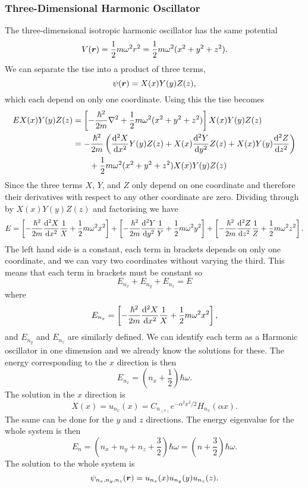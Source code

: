     \subsubsection{Three-Dimensional Harmonic Oscillator}
    The three-dimensional isotropic harmonic oscillator has the same potential
    \[V(\bm{r}) = \frac{1}{2}m\omega^2r^2 = \frac{1}{2}m\omega^2(x^2 + y^2 + z^2).\]
    We can separate the \gls{tise} into a product of three terms,
    \[\psi(\bm{r}) = X(x)Y(y)Z(z),\]
    which each depend on only one coordinate.
    Using this the \gls{tise} becomes
    \begin{align*}
        EX(x)Y(y)Z(z) &= \left[-\frac{\hbar^2}{2m}\nabla^2 + \frac{1}{2}m\omega^2(x^2 + y^2 + z^2)\right]X(x)Y(y)Z(z)\\
        &= -\frac{\hbar^2}{2m}\left(\dv[2]{X}{x}Y(y)Z(z) + X(x)\dv[2]{Y}{y}Z(z) + X(x)Y(y)\dv[2]{Z}{z}\right) \\
        &\qquad+ \frac{1}{2}m\omega^2(x^2 + y^2 + z^2)X(x)Y(y)Z(z)
    \end{align*}
    Since the three terms \(X\), \(Y\), and \(Z\) only depend on one coordinate and therefore their derivatives with respect to any other coordinate are zero.
    Dividing through by \(X(x)Y(y)Z(z)\) and factorising we have
    \[E = \left[-\frac{\hbar^2}{2m}\dv[2]{X}{x}\frac{1}{X} + \frac{1}{2}m\omega^2x^2\right] + \left[-\frac{\hbar^2}{2m}\dv[2]{Y}{y}\frac{1}{Y} + \frac{1}{2}m\omega^2y^2\right] + \left[-\frac{\hbar^2}{2m}\dv[2]{Z}{z}\frac{1}{Z} + \frac{1}{2}m\omega^2z^2\right].\]
    The left hand side is a constant, each term in brackets depends on only one coordinate, and we can vary two coordinates without varying the third.
    This means that each term in brackets must be constant so
    \[E_{n_x} + E_{n_y} + E_{n_z} = E\]
    where
    \[E_{n_x} = \left[-\frac{\hbar^2}{2m}\dv[2]{X}{x}\frac{1}{X} + \frac{1}{2}m\omega^2x^2\right],\]
    and \(E_{n_y}\) and \(E_{n_z}\) are similarly defined.
    We can identify each term as a Harmonic oscillator in one dimension and we already know the solutions for these.
    The energy corresponding to the \(x\) direction is then
    \[E_{n_x} = \left(n_x + \frac{1}{2}\right)\hbar\omega.\]
    The solution in the \(x\) direction is
    \[X(x) = u_{n_x}(x) = C_{n_(x)}e^{-\alpha^2x^2/2}H_{n_x}(\alpha x).\]
    The same can be done for the \(y\) and \(z\) directions.
    The energy eigenvalue for the whole system is then
    \[E_n = \left(n_x + n_y + n_z + \frac{3}{2}\right)\hbar\omega = \left(n + \frac{3}{2}\right)\hbar\omega.\]
    The solution to the whole system is
    \[\psi_{n_x,n_y,n_z}(\bm{r}) = u_{n_x}(x)u_{n_y}(y)u_{n_z}(z).\]
    

